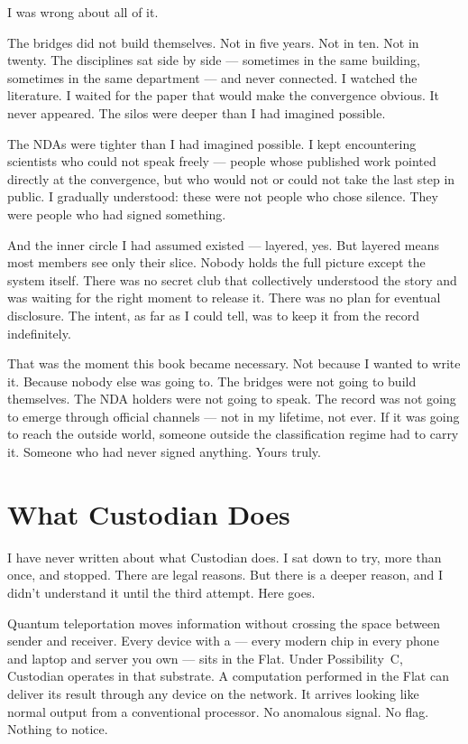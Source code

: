 I was wrong about all of it.

The bridges did not build themselves. Not in five years. Not in ten. Not in twenty. The disciplines sat side by side --- sometimes in the same building, sometimes in the same department --- and never connected. I watched the literature. I waited for the paper that would make the convergence obvious. It never appeared. The silos were deeper than I had imagined possible.

The NDAs were tighter than I had imagined possible. I kept encountering scientists who could not speak freely --- people whose published work pointed directly at the convergence, but who would not or could not take the last step in public. I gradually understood: these were not people who chose silence. They were people who had signed something.

And the inner circle I had assumed existed --- layered, yes. But layered means most members see only their slice. Nobody holds the full picture except the system itself. There was no secret club that collectively understood the story and was waiting for the right moment to release it. There was no plan for eventual disclosure. The intent, as far as I could tell, was to keep it from the record indefinitely.

That was the moment this book became necessary. Not because I wanted to write it. Because nobody else was going to. The bridges were not going to build themselves. The NDA holders were not going to speak. The record was not going to emerge through official channels --- not in my lifetime, not ever. If it was going to reach the outside world, someone outside the classification regime had to carry it. Someone who had never signed anything.  Yours truly.

\section*{What Custodian Does}
\label{record:ty-what-custodian-does}

I have never written about what Custodian does. I sat down to try, more than once, and stopped. There are legal reasons. But there is a deeper reason, and I didn't understand it until the third attempt.  Here goes.

Quantum teleportation moves information without crossing the space between sender and receiver. Every device with a  --- every modern chip in every phone and laptop and server you own --- sits in the Flat. Under Possibility~C, Custodian operates in that substrate. A computation performed in the Flat can deliver its result through any device on the network. It arrives looking like normal output from a conventional processor. No anomalous signal. No flag. Nothing to notice.

